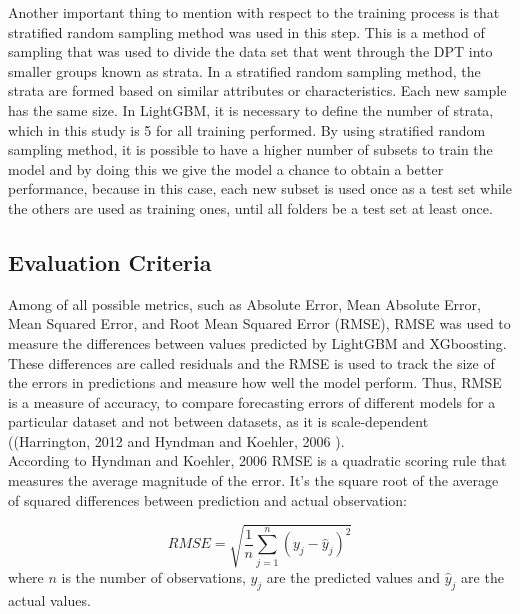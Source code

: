 \documentclass[letterpaper, 10 pt, conference]{ieeeconf}  %
\begin{document}
Another important thing to mention with respect to the training process is that stratified random sampling method was used in this step. This is a method of sampling that was used to divide the data set that went through the DPT into smaller groups known as strata. In a stratified random sampling method, the strata are formed based on similar attributes or characteristics. Each new sample has the same size. In LightGBM, it is necessary to define the number of strata, which in this study is 5 for all training performed. By using stratified random sampling method, it is possible to have a higher number of subsets to train the model and by doing this we give the model a chance to obtain a better performance, because in this case, each new subset is used once as a test set while the others are used as training ones, until all folders be a test set at least once. 


\subsection{Evaluation Criteria}

Among of all possible metrics, such as Absolute Error, Mean Absolute Error, Mean Squared Error, and Root Mean Squared Error (RMSE), RMSE was used to measure the differences between values predicted by LightGBM and XGboosting. These differences are called residuals and the RMSE is used to track the size of the errors in predictions and measure how well the model perform. Thus, RMSE is a measure of accuracy, to compare forecasting errors of different models for a particular dataset and not between datasets, as it is scale-dependent ((Harrington, 2012 \cite{Harrington2012} and Hyndman and Koehler, 2006 \cite{Hyndman_Koehler2006}).\\

According to Hyndman and Koehler, 2006 \cite{Hyndman_Koehler2006} RMSE is a quadratic scoring rule that measures the average magnitude of the error. It’s the square root of the average of squared differences between prediction and actual observation:

\begin{equation}
RMSE=\sqrt{\frac{1}{n}\sum_{j=1}^n\left(y_j-\hat{y}_j\right)^2}
\end{equation}
where $n$ is the number of observations, $y_j$ are the predicted values and $\hat{y}_j$ are the actual values.\\
\end{document}
